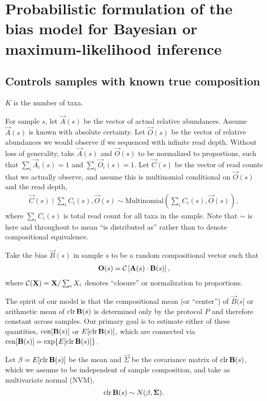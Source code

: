 



\section{Probabilistic formulation of the bias model for Bayesian or
  maximum-likelihood inference}

\subsection{Controls samples with known true composition}

$K$ is the number of taxa.

For sample $s$, let $\vec A(s)$ be the vector of actual relative abundances.
Assume $\vec A(s)$ is known with absolute certainty. Let $\vec O(s)$ be the
vector of relative abundances we would observe if we sequenced with infinite
read depth.  Without loss of generality, take $\vec A(s)$ and $\vec O(s)$ to be
normalized to proportions, such that $\sum_i \vec A_i(s) = 1$ and $\sum_i \vec
O_i(s) = 1$.  Let $\vec C(s)$ be the vector of read counts that we actually
observe, and assume this is multinomial conditional on $\vec O(s)$ and the read
depth,
\begin{align}
  \vec C(s) \mid \sum_i C_i(s), \vec O(s) 
  \sim \mathrm{Multinomial}\left(\sum_i C_i(s), \vec O(s) \right),
\end{align}
where $\sum_i C_i(s)$ is total read count for all taxa in the sample. Note that
$\sim$ is here and throughout to mean ``is distributed as'' rather than to
denote compositional equivalence.

Take the bias $\vec B(s)$ in sample $s$ to be a random compositional vector
such that
\begin{align}
    \label{eq:model}
    \mathbf{O}(s) = \operatorname{\mathcal{C}}\left[ \mathbf{A}(s) \cdot \mathbf{B}(s) \right],
\end{align}
where $\operatorname{\mathcal{C}}(\mathbf{X}) = \mathbf{X} / \sum_i X_i$ denotes ``closure'' or normalization
to proportions.

The spirit of our model is that the compositional mean (or ``center'') of $\vec
B(s]$ or arithmetic mean of $\operatorname{clr} \mathbf{B}(s)$ is determined only by the protocol
$P$ and therefore constant across samples. Our primary goal is to estimate
either of these quantities, $\operatorname{cen}[\mathbf{B}(s)]$ or $E[\operatorname{clr} \mathbf{B}(s)]$, which are
connected via $\operatorname{cen}[\mathbf{B}(s)] = \exp\{ E[\operatorname{clr} \mathbf{B}(s)] \}$.

Let $\beta = E[\operatorname{clr} \mathbf{B}(s)]$ be the mean and $\vec \Sigma$ be the covariance
matrix of $\operatorname{clr} \mathbf{B}(s)$, which we assume to be independent of sample
composition, and take as multivariate normal (NVM),
\begin{align*}
  \operatorname{clr} \mathbf{B}(s) \sim N(\mathbf{\beta}, \mathbf{\Sigma}).
\end{align*}

